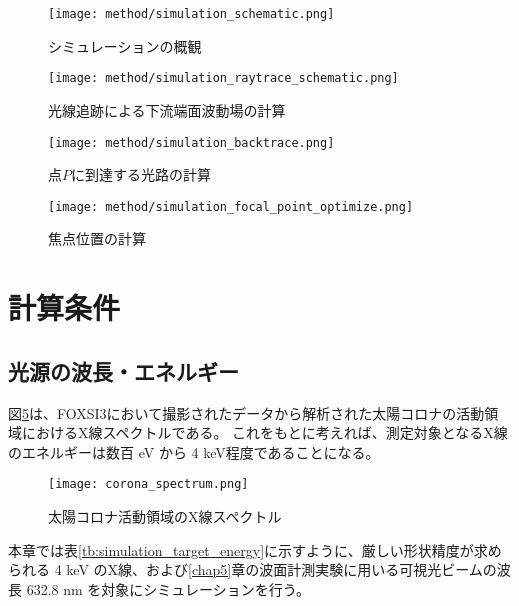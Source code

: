 \begin{figure}[h]
\centering
\texttt{[image: method/simulation\_schematic.png]}
\caption{シミュレーションの概観}
\label{fig:simulation_schematic}
\end{figure}


\begin{figure}[h]
\centering
\texttt{[image: method/simulation\_raytrace\_schematic.png]}
\caption{光線追跡による下流端面波動場の計算}
\label{fig:simulation_raytrace}
\end{figure}

\begin{figure}[h]
\centering
\texttt{[image: method/simulation\_backtrace.png]}
\caption{点$P$に到達する光路の計算}
\label{fig:simulation_backtrace}
\end{figure}

\begin{figure}[h]
\centering
\texttt{[image: method/simulation\_focal\_point\_optimize.png]}
\caption{焦点位置の計算}
\label{fig:simulation_focal_point_optimize}
\end{figure}



\clearpage
\newpage

\section{計算条件}
\label{chap2_simulation_condition}


\subsection{光源の波長・エネルギー}
\label{chap2_incident_beam_energy}

図\ref{fig:corona_spectrum}は、FOXSI3において撮影されたデータから解析された太陽コロナの活動領域におけるX線スペクトルである。\cite{2019AGUFMSH31C3315V}
これをもとに考えれば、測定対象となるX線のエネルギーは数百 eV から 4 keV程度であることになる。

\begin{figure}[ht]
\centering
\texttt{[image: corona\_spectrum.png]}
\caption{太陽コロナ活動領域のX線スペクトル\cite{2019AGUFMSH31C3315V}}
\label{fig:corona_spectrum}
\end{figure}

本章では表\ref{tb:simulation_target_energy}に示すように、厳しい形状精度が求められる 4 keV のX線、および\ref{chap5}章の波面計測実験に用いる可視光ビームの波長 632.8 nm を対象にシミュレーションを行う。

